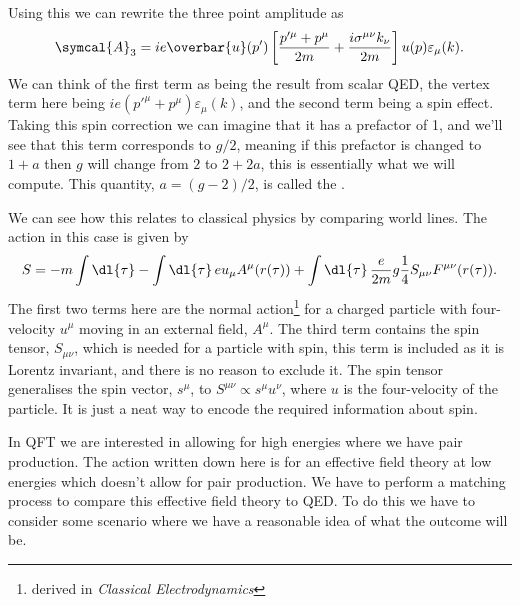 \documentclass[fleqn]{NotesClass}
\newcommand*{\course}[1]{\textit{#1}}
\newcommand{\diracadjoint}[1]{\overbar{#1}}
\newcommand{\amplitude}{\symcal{A}}
\begin{document}
    Using this we can rewrite the three point amplitude as
    \begin{equation}
        \amplitude_3 = ie\diracadjoint{u}(p')\left[ \frac{p'^\mu + p^\mu}{2m} + \frac{i\sigma^{\mu\nu}k_\nu}{2m} \right] u(p) \varepsilon_\mu(k).
    \end{equation}
    We can think of the first term as being the result from scalar QED, the vertex term here being \(ie(p'^\mu + p^\mu)\varepsilon_\mu(k)\), and the second term being a spin effect.
    Taking this spin correction we can imagine that it has a prefactor of 1, and we'll see that this term corresponds to \(g/2\), meaning if this prefactor is changed to \(1 + a\) then \(g\) will change from \(2\) to \(2 + 2a\), this is essentially what we will compute.
    This quantity, \(a = (g - 2)/2\), is called the .
    
    We can see how this relates to classical physics by comparing world lines.
    The action in this case is given by
    \begin{equation}
        S = -m \int \dl{\tau} - \int \dl{\tau} \, e u_\mu A^\mu(r(\tau)) + \int \dl{\tau} \, \frac{e}{2m} g \frac{1}{4}S_{\mu\nu}F^{\mu\nu}(r(\tau)).
    \end{equation}
    The first two terms here are the normal action\footnote{derived in \course{Classical Electrodynamics}} for a charged particle with four-velocity \(u^\mu\) moving in an external field, \(A^\mu\).
    The third term contains the spin tensor, \(S_{\mu\nu}\), which is needed for a particle with spin, this term is included as it is Lorentz invariant, and there is no reason to exclude it.
    The spin tensor generalises the spin vector, \(s^\mu\), to \(S^{\mu\nu} \propto s^\mu u^\nu \), where \(u\) is the four-velocity of the particle.
    It is just a neat way to encode the required information about spin.
    
    In QFT we are interested in allowing for high energies where we have pair production.
    The action written down here is for an effective field theory at low energies which doesn't allow for pair production.
    We have to perform a matching process to compare this effective field theory to QED.
    To do this we have to consider some scenario where we have a reasonable idea of what the outcome will be.
    
\end{document}
